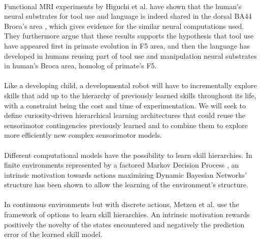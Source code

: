\documentclass[12pt]{article}
\begin{document}
		\paragraph{}
		Functional MRI experiments by Higuchi et al. have shown that the human's neural substrates for tool use and language is indeed shared in 
		the dorsal BA44 Broca's area \cite{higuchi}, which gives evidence for the similar neural computations used. 
		They furthermore argue that these results supports the hypothesis that tool use have appeared first in primate evolution in F5 area,
		and then the language has developed in humans reusing part of tool use and manipulation neural substrates in human's Broca area, homolog of primate's F5.
	

		\paragraph{}
		Like a developing child, a developmental robot will have to incrementally explore skills that add up to the hierarchy of previously learned skills 
		throughout its life, with a constraint being the cost and time of experimentation. 
		We will seek to define curiosity-driven hierarchical learning architectures 
		that could reuse the sensorimotor contingencies previously learned and to combine them 
		to explore more efficiently new complex sensorimotor models. 
		
		\paragraph{}
		Different computational models have the possibility to learn skill hierarchies. 
		In finite environments represented by a factored Markov Decision Process \cite{vig}, an intrinsic motivation towards actions 
		maximizing Dynamic Bayesian Networks' structure has been shown to allow the learning of the environment's structure.
		
		\paragraph{}
		In continuous environments but with discrete actions, Metzen et al. \cite{metzen2013} use the framework of options \cite{sutton1999between} 
		to learn skill hierarchies. 
		An intrinsic motivation rewards positively the novelty of the states encountered and negatively the prediction error of the learned skill model.
		
\end{document}

